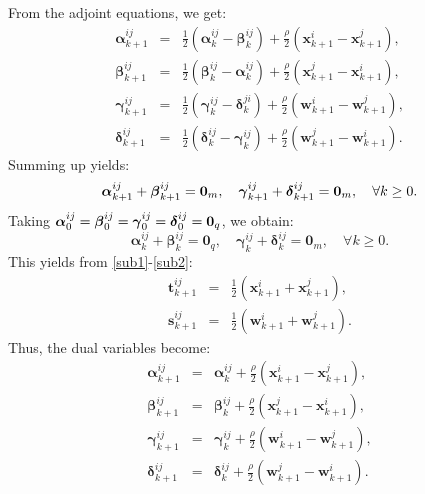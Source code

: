 \documentclass[11pt,a4paper]{article}
\theoremstyle{plain}
\theoremstyle{definition}
\theoremstyle{remark}
\begin{document}
	From the adjoint equations, we get:
	\begin{eqnarray*}
		\boldsymbol{\alpha}_{k+1}^{ij} &=& \frac{1}{2} (\boldsymbol{\alpha}_k^{ij} - 
		\boldsymbol{\beta}_k^{ij}) + \frac{\rho}{2} (\boldsymbol{x}_{k+1}^i - 
		\boldsymbol{x}_{k+1}^j), \\
		\boldsymbol{\beta}_{k+1}^{ij} &=& \frac{1}{2} (\boldsymbol{\beta}_k^{ij} - 
		\boldsymbol{\alpha}_k^{ij}) + \frac{\rho}{2} (\boldsymbol{x}_{k+1}^j - 
		\boldsymbol{x}_{k+1}^i), \\
		\boldsymbol{\gamma}_{k+1}^{ij} &=& \frac{1}{2} (\boldsymbol{\gamma}_k^{ij} - 
		\boldsymbol{\delta}_k^{ji}) + \frac{\rho}{2} (\boldsymbol{w}_{k+1}^i - 
		\boldsymbol{w}_{k+1}^j), \\
		\boldsymbol{\delta}_{k+1}^{ij} &=& \frac{1}{2} (\boldsymbol{\delta}_k^{ij} - 
		\boldsymbol{\gamma}_k^{ij}) + \frac{\rho}{2} (\boldsymbol{w}_{k+1}^j - 
		\boldsymbol{w}_{k+1}^i).
	\end{eqnarray*}
	Summing up yields:
	\begin{equation*}
		\boldsymbol{\alpha}_{k+1}^{ij} + \boldsymbol{\beta}_{k+1}^{ij} = \boldsymbol{%
			0}_m, \quad \boldsymbol{\gamma}_{k+1}^{ij} + \boldsymbol{\delta}_{k+1}^{ij}
		= \boldsymbol{0}_m, \quad \forall k \geq 0.
	\end{equation*}
	Taking $\boldsymbol{\alpha}_0^{ij} = \boldsymbol{\beta}_0^{ij} = \boldsymbol{%
		\gamma}_0^{ij} = \boldsymbol{\delta}_0^{ij} = \boldsymbol{0}_q $, we obtain:
	\begin{equation*}
		\boldsymbol{\alpha}_k^{ij} + \boldsymbol{\beta}_k^{ij} = \boldsymbol{0}_q,
		\quad \boldsymbol{\gamma}_k^{ij} + \boldsymbol{\delta}_k^{ij} = \boldsymbol{0%
		}_m, \quad \forall k \geq 0.
	\end{equation*}
	This yields from \eqref{sub1}-\eqref{sub2}:
	\begin{eqnarray*}
		\boldsymbol{t}_{k+1}^{ij} &=& \frac{1}{2} (\boldsymbol{x}_{k+1}^i + 
		\boldsymbol{x}_{k+1}^j), \\
		\boldsymbol{s}_{k+1}^{ij} &=& \frac{1}{2} (\boldsymbol{w}_{k+1}^i + 
		\boldsymbol{w}_{k+1}^j).
	\end{eqnarray*}
	Thus, the dual variables become:
	\begin{subequations}
		\begin{eqnarray}
			\boldsymbol{\alpha}_{k+1}^{ij} &=& \boldsymbol{\alpha}_k^{ij} + \frac{\rho}{2} \left( \boldsymbol{x}_{k+1}^i - \boldsymbol{x}_{k+1}^j \right), \label{B1}\\
			\boldsymbol{\beta}_{k+1}^{ij}  &=& \boldsymbol{\beta}_k^{ij} + \frac{\rho}{2} \left( \boldsymbol{x}_{k+1}^j - \boldsymbol{x}_{k+1}^i \right), \\
			\boldsymbol{\gamma}_{k+1}^{ij} &=& \boldsymbol{\gamma}_k^{ij} +  \frac{\rho}{2} \left( \boldsymbol{w}_{k+1}^i - \boldsymbol{w}_{k+1}^j \right), \\
			\boldsymbol{\delta}_{k+1}^{ij} &=& \boldsymbol{\delta}_k^{ij} +  \frac{\rho}{2} \left( \boldsymbol{w}_{k+1}^j - \boldsymbol{w}_{k+1}^i \right).\label{B4}
		\end{eqnarray}
	\end{subequations}
\end{document}
